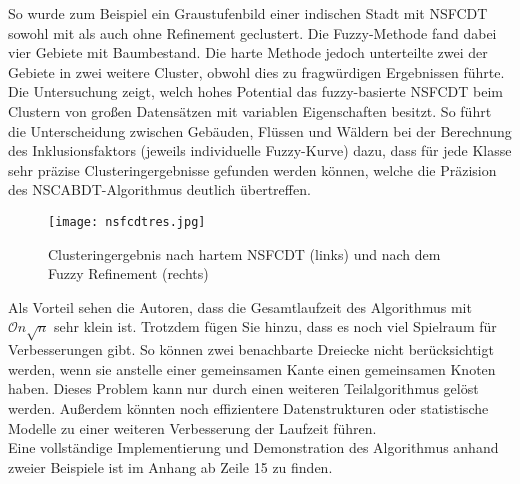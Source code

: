 \documentclass[11pt,ceqn]{book}
\begin{document}
So wurde zum Beispiel ein Graustufenbild einer indischen Stadt mit NSFCDT sowohl mit als auch ohne Refinement geclustert. Die Fuzzy-Methode fand dabei vier Gebiete mit Baumbestand. Die harte Methode jedoch unterteilte zwei der Gebiete in zwei weitere Cluster, obwohl dies zu fragwürdigen Ergebnissen führte. Die Untersuchung zeigt, welch hohes Potential das fuzzy-basierte NSFCDT beim Clustern von großen Datensätzen mit variablen Eigenschaften besitzt. So führt die Unterscheidung zwischen Gebäuden, Flüssen und Wäldern bei der Berechnung des Inklusionsfaktors  (jeweils individuelle Fuzzy-Kurve) dazu, dass für jede Klasse sehr präzise Clusteringergebnisse gefunden werden können, welche die Präzision des NSCABDT-Algorithmus deutlich übertreffen.

\begin{figure}[H]
\centering
\texttt{[image: nsfcdtres.jpg]}
\caption{Clusteringergebnis nach hartem NSFCDT (links) und nach dem Fuzzy Refinement (rechts)}
\end{figure}


Als Vorteil sehen die Autoren, dass die Gesamtlaufzeit des Algorithmus mit $\mathcal{O}n\sqrt{n}$ sehr klein ist. Trotzdem fügen Sie hinzu, dass es noch viel Spielraum für Verbesserungen gibt. So können zwei benachbarte Dreiecke nicht berücksichtigt werden, wenn sie anstelle einer gemeinsamen Kante einen gemeinsamen Knoten haben. Dieses Problem kann nur durch einen weiteren Teilalgorithmus gelöst werden. Außerdem könnten noch effizientere Datenstrukturen oder statistische Modelle zu einer weiteren Verbesserung der Laufzeit führen.
~\\

Eine vollständige Implementierung und Demonstration des Algorithmus anhand zweier Beispiele ist im Anhang ab Zeile 15 zu finden.
 
\clearpage
\end{document}
